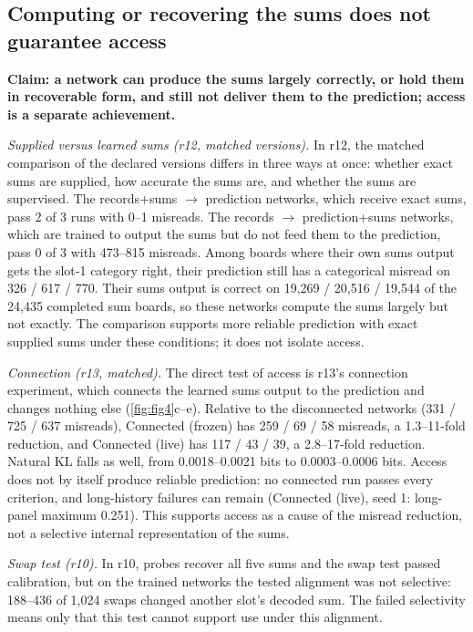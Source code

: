 \subsection{Computing or recovering the sums does not guarantee access}\label{sec:res-access}

\textbf{Claim: a network can produce the sums largely correctly, or hold them
in recoverable form, and still not deliver them to the prediction; access is
a separate achievement.}

\emph{Supplied versus learned sums (r12, matched versions).} In r12, the matched
comparison of the declared versions differs in three ways at once: whether
exact sums are supplied, how accurate the sums are, and whether the sums
are supervised. The records+sums $\to$ prediction
networks, which receive exact sums, pass 2 of 3 runs with 0--1 misreads. The
records $\to$ prediction+sums networks, which are trained to output the sums
but do not feed them to the prediction, pass 0 of 3 with 473--815 misreads.
Among boards where their own sums output gets the slot-1 category right,
their prediction still has a categorical misread on 326 / 617 / 770. Their sums output is
correct on 19,269 / 20,516 / 19,544 of the 24,435 completed sum boards, so
these networks compute the sums largely but not exactly. The comparison
supports more reliable prediction with exact supplied sums under these
conditions; it does not isolate access.

\emph{Connection (r13, matched).} The direct test of access is r13's
connection experiment, which connects the learned sums output to the
prediction and changes nothing else (\cref{fig:fig4}c--e). Relative to the
disconnected networks (331 / 725 / 637 misreads), Connected (frozen) has
259 / 69 / 58 misreads, a 1.3--11-fold reduction, and Connected (live) has
117 / 43 / 39, a 2.8--17-fold reduction. Natural KL falls as well, from
0.0018--0.0021 bits to 0.0003--0.0006 bits. Access does not by itself produce reliable prediction: no connected run passes every criterion,
and long-history failures can remain (Connected (live), seed 1: long-panel
maximum 0.251). This supports access as a cause of the misread reduction,
not a selective internal representation of the sums.

\emph{Swap test (r10).} In r10, probes recover all five sums and the swap
test passed calibration,
but on the trained networks the tested alignment was not selective: 188--436
of 1,024 swaps changed another slot's decoded sum. The failed selectivity means only that this test cannot support use under
this alignment.

